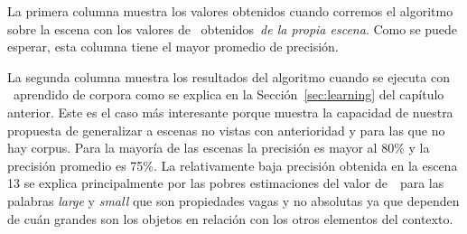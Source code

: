 La primera columna muestra los valores obtenidos cuando corremos el algoritmo sobre la escena
con los valores de \puse\ obtenidos~\emph{de la propia escena}. Como se puede esperar,
esta columna tiene el mayor promedio de precisi\'on.

La segunda columna muestra los resultados del algoritmo cuando se ejecuta con \puse\ aprendido de
corpora como se explica en la Secci\'on~\ref{sec:learning} del cap\'itulo anterior. Este es el caso m\'as interesante porque muestra la capacidad de nuestra propuesta de generalizar a escenas no vistas con anterioridad y para las que no hay corpus. Para la mayor\'{i}a de las escenas la precisi\'on
es mayor al 80\% y la precisi\'on promedio es 75\%. La relativamente baja precisi\'on
obtenida en la escena 13 se explica principalmente por las pobres estimaciones del valor de~\puse\ para las palabras \emph{large} y \emph{small} que son propiedades vagas y no absolutas ya que dependen de cu\'an grandes son los objetos en relaci\'on con los otros elementos del contexto.  

